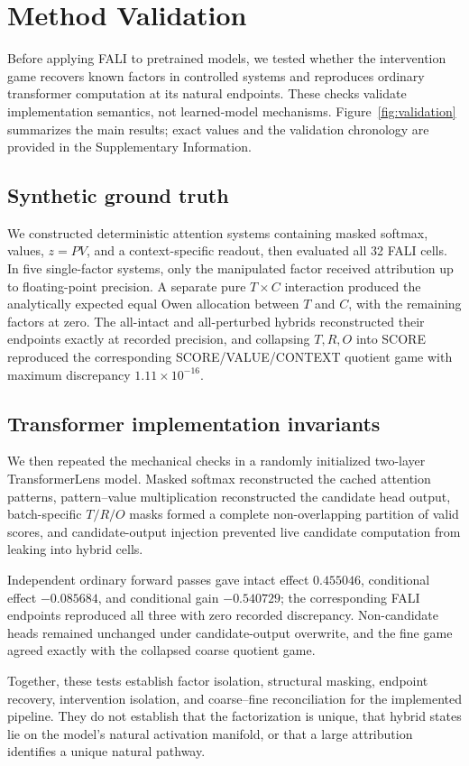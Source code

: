 \section{Method Validation}\label{sec:validation}

Before applying FALI to pretrained models, we tested whether the intervention game recovers known factors in controlled systems and reproduces ordinary transformer computation at its natural endpoints. These checks validate implementation semantics, not learned-model mechanisms. Figure~\ref{fig:validation} summarizes the main results; exact values and the validation chronology are provided in the Supplementary Information.



\subsection{Synthetic ground truth}\label{sec:synthetic}

We constructed deterministic attention systems containing masked softmax, values, $z=PV$, and a context-specific readout, then evaluated all 32 FALI cells. In five single-factor systems, only the manipulated factor received attribution up to floating-point precision. A separate pure $T\times C$ interaction produced the analytically expected equal Owen allocation between $T$ and $C$, with the remaining factors at zero. The all-intact and all-perturbed hybrids reconstructed their endpoints exactly at recorded precision, and collapsing $T,R,O$ into SCORE reproduced the corresponding SCORE\slash VALUE\slash CONTEXT quotient game with maximum discrepancy $1.11\times10^{-16}$.

\subsection{Transformer implementation invariants}\label{sec:implementation-validation}

We then repeated the mechanical checks in a randomly initialized two-layer TransformerLens model. Masked softmax reconstructed the cached attention patterns, pattern--value multiplication reconstructed the candidate head output, batch-specific $T/R/O$ masks formed a complete non-overlapping partition of valid scores, and candidate-output injection prevented live candidate computation from leaking into hybrid cells.

Independent ordinary forward passes gave intact effect $0.455046$, conditional effect $-0.085684$, and conditional gain $-0.540729$; the corresponding FALI endpoints reproduced all three with zero recorded discrepancy. Non-candidate heads remained unchanged under candidate-output overwrite, and the fine game agreed exactly with the collapsed coarse quotient game.

Together, these tests establish factor isolation, structural masking, endpoint recovery, intervention isolation, and coarse--fine reconciliation for the implemented pipeline. They do not establish that the factorization is unique, that hybrid states lie on the model's natural activation manifold, or that a large attribution identifies a unique natural pathway.
